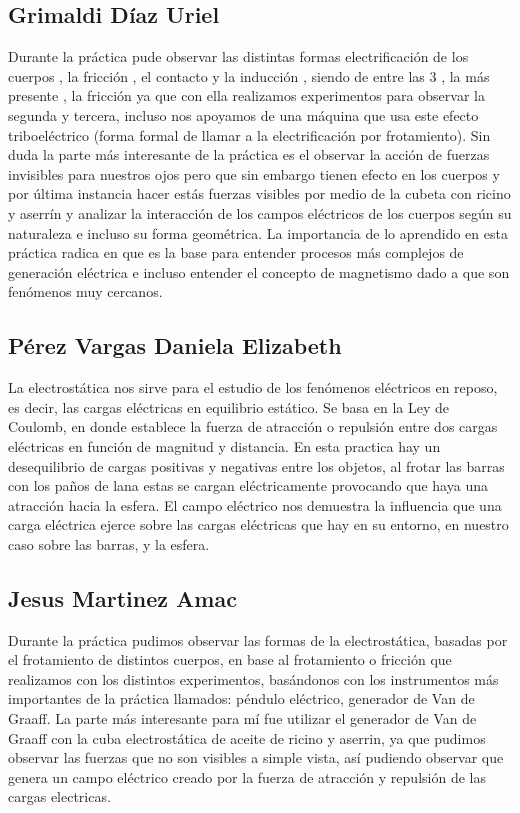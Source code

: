 \documentclass[10pt]{article}
\begin{document}
\begin{multicols}{2}
	\subsection{Grimaldi Díaz Uriel}

	Durante la práctica pude observar las distintas formas electrificación de los cuerpos , la fricción , el contacto y la inducción , siendo de entre las 3 , la más presente , la fricción ya que con ella realizamos experimentos para observar la segunda y tercera, incluso nos apoyamos de una máquina que usa este efecto triboeléctrico (forma formal de llamar a la electrificación por frotamiento). Sin duda la parte más interesante de la práctica es el observar la acción de fuerzas invisibles para nuestros ojos pero que sin embargo tienen efecto en los cuerpos y por última instancia hacer estás fuerzas visibles por medio de la cubeta con ricino y aserrín y analizar la interacción de los campos eléctricos de los cuerpos según su naturaleza e incluso su forma geométrica. La importancia de lo aprendido en esta práctica radica en que es la base para entender procesos más complejos de generación eléctrica e incluso entender el concepto de magnetismo dado a que son fenómenos muy cercanos.
	\subsection{Pérez Vargas Daniela Elizabeth}
	La electrostática nos sirve para el estudio de los fenómenos eléctricos en reposo, es decir, las cargas eléctricas en equilibrio estático. Se basa en la Ley de Coulomb, en donde establece la fuerza de atracción o repulsión entre dos cargas eléctricas en función de magnitud y distancia. En esta practica hay un desequilibrio de cargas positivas y negativas entre los objetos, al frotar las barras con los paños de lana estas se cargan eléctricamente provocando que haya una atracción hacia la esfera. El campo eléctrico nos demuestra la influencia que una carga eléctrica ejerce sobre las cargas eléctricas que hay en su entorno, en nuestro caso sobre las barras, y la esfera.
	\subsection{Jesus Martinez Amac}

	Durante la práctica pudimos observar las formas de la electrostática, basadas por el frotamiento de distintos cuerpos, en base al frotamiento o fricción que realizamos con los distintos experimentos, basándonos con los instrumentos más importantes de la práctica llamados: péndulo eléctrico, generador de Van de Graaff. La parte más interesante para mí fue utilizar el generador de Van de Graaff con la cuba electrostática de aceite de ricino y aserrin, ya que pudimos observar las fuerzas que no son visibles a simple vista, así pudiendo observar que genera un campo eléctrico creado por la fuerza de atracción y repulsión de las cargas electricas.


\end{multicols}
\end{document}
